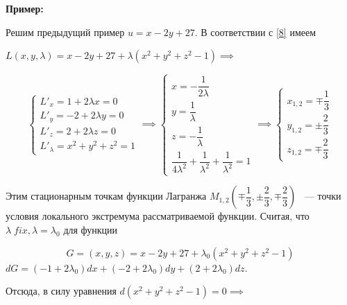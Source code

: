 \documentclass[../../main.tex]{subfiles}
\begin{document}
	\textbf{Пример:}
	
	Решим предыдущий пример $u = x - 2y + 27$. В 
	соответствии с \eqref{8} 
	имеем 
	
	$L \left( x, y, \lambda \right) = x - 2y + 27 + \lambda \left( x^2 + y^2 
	+ z^2 - 1 \right) \implies$ 
	
	\begin{equation}
	\begin{cases}
	L'_x = 1 + 2 \lambda x = 0 \\
	L'_y = -2 + 2 \lambda y = 0 \\
	L'_z = 2 + 2 \lambda z = 0 \\
	L'_\lambda = x^2 + y^2 + z^2 = 1
	\end{cases} \implies
	\begin{cases}
	x = -\dfrac{1}{2\lambda} \\
	y = \dfrac{1}{\lambda} \\
	z = -\dfrac{1}{\lambda} \\
	\dfrac{1}{4\lambda^2} + \dfrac{1}{\lambda^2} + \dfrac{1}{\lambda^2} = 1
	\end{cases} \implies
	\begin{cases}
	x_{1, 2} = \mp \dfrac{1}{3} \\
	y_{1, 2} = \pm \dfrac{2}{3} \\
	z_{1, 2} = \mp \dfrac{2}{3} 
	\end{cases}
	\end{equation}
	
	Этим стационарным точкам функции Лагранжа $M_{1, 2} \left( \mp \dfrac{1}{3}, 
	\pm \dfrac{2}{3}, \mp \dfrac{2}{3} \right) $ ~--- точки условия локального
	экстремума рассматриваемой функции. Считая, что $\lambda\; fix, 
	\lambda = \lambda_0$ для функции
	
	\[G = \left( x, y, z \right) = x - 2y + 27 + 
	\lambda_0\left( x^2 + y^2 + z^2 - 1 \right)\]
	$
	dG = \left( -1 + 2 \lambda_0 \right)dx + \left( -2 + 2\lambda_0 \right)dy 
	+ \left( 2 + 2 \lambda_0 \right) dz $.
	\smallskip
	
	Отсюда, в силу 	уравнения $d\left( x^2 + y^2 + z^2 - 1 
	\right) = 0 \implies$
	
\end{document}
